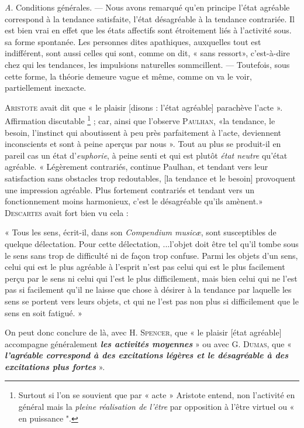 {\it A}. Conditions générales. — Nous avons remarqué qu’en principe
l’état agréable correspond à la tendance satisfaite, l’état désagréable à
la tendance contrariée. Il est bien vrai en effet que les états affectifs
sont étroitement liés à l’activité sous. sa forme spontanée. Les personnes
dites apathiques, auxquelles tout est indifférent, sont aussi
celles qui sont, comme on dit, « sans ressort», c’est-à-dire chez qui
les tendances, les impulsions naturelles sommcillent. — Toutefois,
sous cette forme, la théorie demeure vague et même, comme on va
le voir, partiellement inexacte.

\textsc{Aristote} avait dit que « le plaisir [disons : l’état agréable] parachève l’acte ».
Affirmation discutable \footnote{Surtout si l’on se souvient que par « acte » Aristote entend, non l'activité en général
mais la {\it pleine réalisation de l'être} par opposition à l'être virtuel ou « en puissance ".} ;
car, ainsi que l’observe
\textsc{Paulhan}, «la tendance, le besoin, l'instinct qui aboutissent à peu
près parfaitement à l’acte, deviennent inconscients et sont à peine
aperçus par nous ». Tout au plus se produit-il en pareil cas un état
d’{\it euphorie}, à peine senti et qui est plutôt {\it état neutre} qu’état agréable.
« Légèrement contrariés, continue Paulhan, et tendant vers leur satisfaction
sans obstacles trop redoutables, [la tendance et le besoin] provoquent
une impression agréable. Plus fortement contrariés et tendant
vers un fonctionnement moins harmonieux, c’est le désagréable
qu’ils amènent.» \textsc{Descartes} avait fort bien vu cela :

{\footnotesize
« Tous les sens, écrit-il, dans son {\it Compendium musicæ}, sont susceptibles
de quelque délectation. Pour cette délectation, ...l’objet doit être tel qu'il
tombe sous le sens sans trop de difficulté ni de façon trop confuse. Parmi les
objets d’un sens, celui qui est le plus agréable à l'esprit n’est pas celui qui
est le plus facilement perçu par le sens ni celui qui l’est le plus difficilement,
mais bien celui qui ne l’est pas si facilement qu'il ne laisse que chose à
désirer à la tendance par laquelle les sens se portent vers leurs objets, ct
qui ne l’est pas non plus si difficilement que le sens en soit fatigué. »
}

On peut donc conclure de là, avec H. \textsc{Spencer}, que « le plaisir [état
agréable] accompagne généralement \textbf{\textit {les activités moyennes}} » ou avec
G. \textsc{Dumas}, que « \textbf{\textit {l'agréable correspond à des excitations légères
et le désagréable à des excitations plus fortes}} ».

